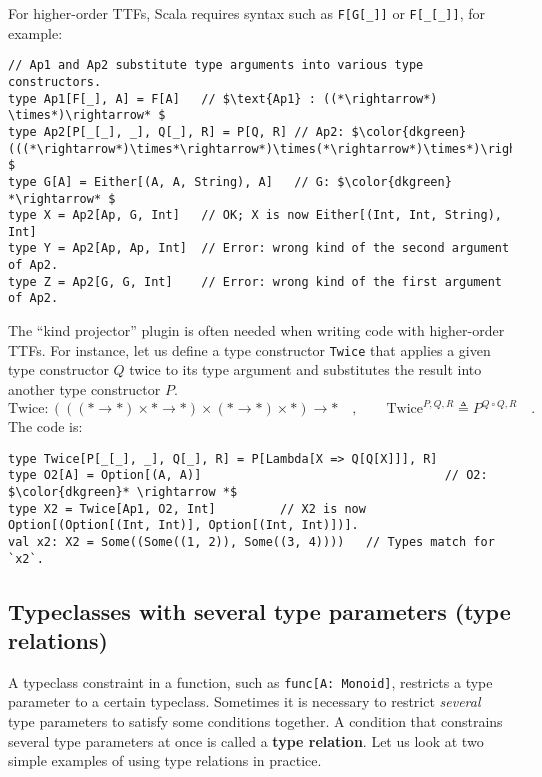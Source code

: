 For higher-order TTFs, Scala requires syntax such as \lstinline!F[G[_]]!
or \lstinline!F[_[_]]!, for example:
\begin{lstlisting}[mathescape=true]
// Ap1 and Ap2 substitute type arguments into various type constructors.
type Ap1[F[_], A] = F[A]   // $\text{Ap1} : ((*\rightarrow*) \times*)\rightarrow* $
type Ap2[P[_[_], _], Q[_], R] = P[Q, R] // Ap2: $\color{dkgreen}(((*\rightarrow*)\times*\rightarrow*)\times(*\rightarrow*)\times*)\rightarrow* $
type G[A] = Either[(A, A, String), A]   // G: $\color{dkgreen} *\rightarrow* $
type X = Ap2[Ap, G, Int]   // OK; X is now Either[(Int, Int, String), Int]
type Y = Ap2[Ap, Ap, Int]  // Error: wrong kind of the second argument of Ap2.
type Z = Ap2[G, G, Int]    // Error: wrong kind of the first argument of Ap2.
\end{lstlisting}
The \textsf{``}kind projector\textsf{''} plugin is often needed when writing code
with higher-order TTFs. For instance, let us define a type constructor
\lstinline!Twice! that applies a given type constructor $Q$ twice
to its type argument and substitutes the result into another type
constructor $P$.
\[
\text{Twice}:(((*\rightarrow*)\times*\rightarrow*)\times(*\rightarrow*)\times*)\rightarrow*\quad,\quad\quad\text{Twice}^{P,Q,R}\triangleq P^{Q\circ Q,R}\quad.
\]
The code is:
\begin{lstlisting}[mathescape=true]
type Twice[P[_[_], _], Q[_], R] = P[Lambda[X => Q[Q[X]]], R]
type O2[A] = Option[(A, A)]                                  // O2: $\color{dkgreen}* \rightarrow *$
type X2 = Twice[Ap1, O2, Int]         // X2 is now Option[(Option[(Int, Int)], Option[(Int, Int)])].
val x2: X2 = Some((Some((1, 2)), Some((3, 4))))   // Types match for `x2`.
\end{lstlisting}


\subsection{Typeclasses with several type parameters (type relations)\label{subsec:Typeclasses-type-relations}}

A typeclass constraint in a function, such as \lstinline!func[A: Monoid]!,
restricts a type parameter to a certain typeclass. Sometimes it is
necessary to restrict \emph{several} type parameters to satisfy some
conditions together. A condition that constrains several type parameters
at once is called a \textbf{type relation}.
Let us look at two simple examples of using type relations in practice. 

